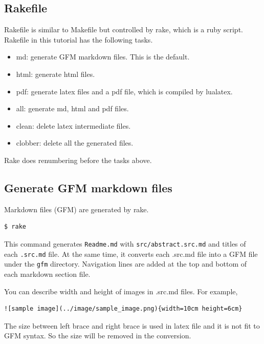 \hypertarget{rakefile}{%
\subsection{Rakefile}\label{rakefile}}

Rakefile is similar to Makefile but controlled by rake, which is a ruby
script. Rakefile in this tutorial has the following tasks.

\begin{itemize}
\tightlist
\item
  md: generate GFM markdown files. This is the default.
\item
  html: generate html files.
\item
  pdf: generate latex files and a pdf file, which is compiled by
  lualatex.
\item
  all: generate md, html and pdf files.
\item
  clean: delete latex intermediate files.
\item
  clobber: delete all the generated files.
\end{itemize}

Rake does renumbering before the tasks above.

\hypertarget{generate-gfm-markdown-files}{%
\subsection{Generate GFM markdown
files}\label{generate-gfm-markdown-files}}

Markdown files (GFM) are generated by rake.

\begin{verbatim}
$ rake
\end{verbatim}

This command generates \texttt{Readme.md} with
\texttt{src/abstract.src.md} and titles of each \texttt{.src.md} file.
At the same time, it converts each .src.md file into a GFM file under
the \texttt{gfm} directory. Navigation lines are added at the top and
bottom of each markdown section file.

You can describe width and height of images in .src.md files. For
example,

\begin{verbatim}
![sample image](../image/sample_image.png){width=10cm height=6cm}
\end{verbatim}

The size between left brace and right brace is used in latex file and it
is not fit to GFM syntax. So the size will be removed in the conversion.

